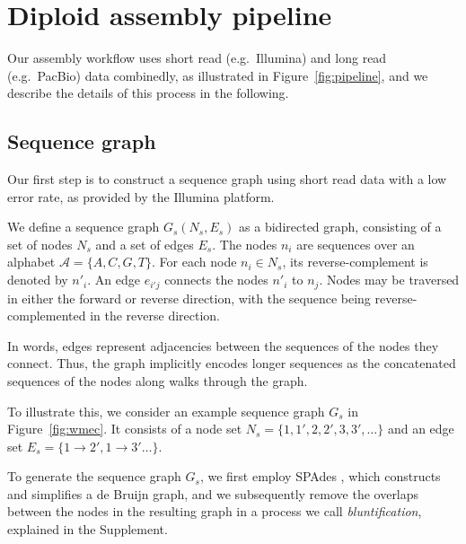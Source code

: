 \section{Diploid assembly pipeline}
Our assembly workflow uses short read (e.g.\ Illumina) and long read (e.g.\ PacBio) data combinedly, as illustrated in Figure~\ref{fig:pipeline}, and we describe the details of this process in the following.

\subsection{Sequence graph} 
Our first step is to construct a sequence graph using short read data with a low error rate, as provided by the Illumina platform.
\begin{definition}
We define a sequence graph $G_s (N_s, E_s)$ as a bidirected graph, consisting of a set of nodes $N_s$ and a set of edges $E_s$.
The nodes $n_i$ are sequences over an alphabet $\mathcal{A} = \{A,C,G,T\}$.
For each node $n_i \in N_s$, its reverse-complement is denoted by $n'_i$.
An edge $e_{i'j}$ connects the nodes $n'_i$ to $n_j$. 
Nodes may be traversed in either the forward or reverse direction, with the sequence being reverse-complemented in the reverse direction. 
\end{definition}

In words, edges represent adjacencies between the sequences of the nodes they connect.
Thus, the graph implicitly encodes longer sequences as the concatenated sequences of the nodes along walks through the graph.

To illustrate this, we consider an example sequence graph $G_s$ in Figure~\ref{fig:wmec}. It consists of a node set $N_s = \{1, 1', 2, 2', 3, 3', \ldots\}$
and an edge set $E_s = \{1 \rightarrow 2', 1 \rightarrow 3' \ldots\}$.

To generate the sequence graph $G_s$, we first employ SPAdes \citep{bankevich2012spades}, which constructs and simplifies a de Bruijn graph, and we subsequently remove the overlaps between the nodes in the resulting graph in a process we call \textit{bluntification}, explained in the Supplement.


